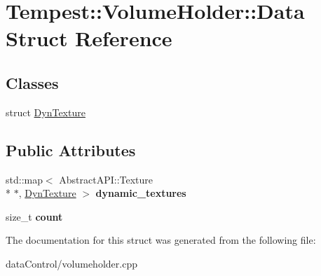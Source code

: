 \hypertarget{struct_volume_holder_1_1_data}{\section{Tempest\+:\+:Volume\+Holder\+:\+:Data Struct Reference}
\label{struct_volume_holder_1_1_data}
}
\subsection*{Classes}
\begin{DoxyCompactItemize}
\item 
struct \hyperlink{struct_volume_holder_1_1_data_1_1_dyn_texture}{Dyn\+Texture}
\end{DoxyCompactItemize}
\subsection*{Public Attributes}
\begin{DoxyCompactItemize}
\item 
\hypertarget{struct_volume_holder_1_1_data_aa109cca588a39b5e6091ab943428fe18}{std\+::map$<$ Abstract\+A\+P\+I\+::\+Texture \\*
$\ast$, \hyperlink{struct_volume_holder_1_1_data_1_1_dyn_texture}{Dyn\+Texture} $>$ {\bfseries dynamic\+\_\+textures}}\label{struct_volume_holder_1_1_data_aa109cca588a39b5e6091ab943428fe18}

\item 
\hypertarget{struct_volume_holder_1_1_data_a923a421784bbc185935e0696abaf2189}{size\+\_\+t {\bfseries count}}\label{struct_volume_holder_1_1_data_a923a421784bbc185935e0696abaf2189}

\end{DoxyCompactItemize}


The documentation for this struct was generated from the following file\+:\begin{DoxyCompactItemize}
\item 
data\+Control/volumeholder.\+cpp\end{DoxyCompactItemize}
